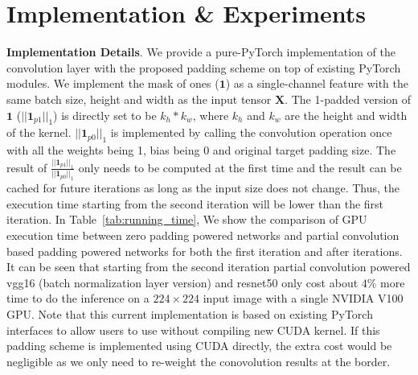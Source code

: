 \documentclass[10pt,twocolumn,letterpaper]{article}
\begin{document}
\section{Implementation \& Experiments}\textbf{Implementation Details}. We provide a pure-PyTorch implementation of the convolution layer with the proposed padding scheme on top of existing PyTorch modules. We implement the mask of ones ($\mathbf{1}$) as a single-channel feature with the same batch size, height and width as the input tensor $\mathbf{X}$. The 1-padded version of $\mathbf{1}$ ($||\mathbf{1}_{p1}||_1$) is directly set to be $k_h * k_w$, where $k_h$ and $k_w$ are the height and width of the kernel. $||\mathbf{1}_{p0}||_1$ is implemented by calling the convolution operation once with all the weights being 1, bias being 0 and original target padding size. The result of $\frac{||\mathbf{1}_{p1}||_1}{||\mathbf{1}_{p0}||_1}$ only needs to be computed at the first time and the result can be cached for future iterations as long as  the input size does not change. Thus, the execution time starting from the second iteration will be lower than the first iteration.  In Table~\ref{tab:running_time}, We show the comparison of GPU execution time between zero padding powered networks and partial convolution based padding powered networks for both the first iteration and after iterations. It can be seen that starting from the second iteration partial convolution powered vgg16 (batch normalization layer version) and resnet50 only cost about $4$\% more time to do the inference on a $224 \times 224$ input image with a single NVIDIA V100 GPU. Note that this current implementation is based on existing PyTorch interfaces to allow users to use without compiling new CUDA kernel. If this padding scheme is implemented using CUDA directly, the extra cost would be negligible as we only need to re-weight the conovolution results at the border. 
\end{document}
